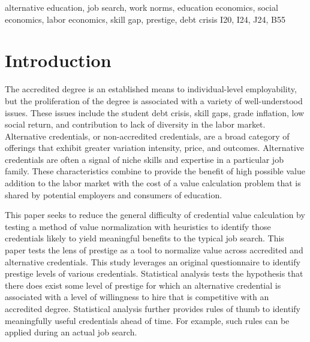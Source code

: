 \documentclass[review]{elsarticle}
\begin{document}
\begin{frontmatter}
    \begin{keyword}
        alternative education, job search, work norms, education economics, social economics, labor economics, skill gap, prestige, debt crisis    %
        \MSC[2010] I20, I24, J24, B55                                                                     %
    \end{keyword}

\end{frontmatter}

\pagebreak
\linenumbers

\section{Introduction}

The accredited degree is an established means to individual-level employability, but the proliferation of the degree is associated with a variety of well-understood issues.
These issues include the student debt crisis, skill gaps, grade inflation, low social return, and contribution to lack of diversity in the labor market.
Alternative credentials, or non-accredited credentials, are a broad category of offerings that exhibit greater variation intensity, price, and outcomes\cite{urdan_2020}.
Alternative credentials are often a signal of niche skills and expertise in a particular job family.
These characteristics combine to provide the benefit of high possible value addition to the labor market
with the cost of a value calculation problem that is shared by potential employers and consumers of education.

This paper seeks to reduce the general difficulty of credential value calculation by testing a method of value normalization
with heuristics to identify those credentials likely to yield meaningful benefits to the typical job search.
This paper tests the lens of prestige as a tool to normalize value across accredited and alternative credentials.
This study leverages an original questionnaire to identify prestige levels of various credentials.
Statistical analysis tests the hypothesis that there does exist some level of prestige for which an alternative credential
is associated with a level of willingness to hire that is competitive with an accredited degree.
Statistical analysis further provides rules of thumb to identify meaningfully useful credentials ahead of time.
For example, such rules can be applied during an actual job search.
\end{document}
